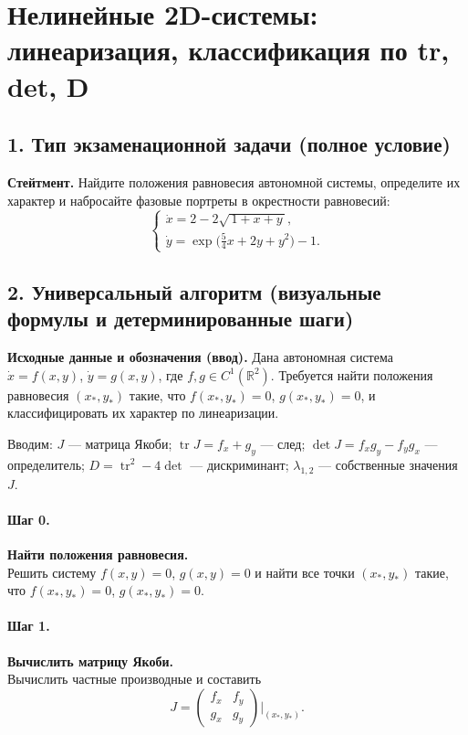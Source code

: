 \section{Нелинейные 2D-системы: линеаризация, классификация по tr, det, D}

\subsection*{1. Тип экзаменационной задачи (полное условие)}
\textbf{Стейтмент.}
Найдите положения равновесия автономной системы, определите их характер и набросайте фазовые портреты в окрестности равновесий:
\[
\begin{cases}
\dot{x}=2-2\sqrt{\,1+x+y\,},\\[4pt]
\dot{y}=\exp\!\bigl(\tfrac{5}{4}x+2y+y^{2}\bigr)-1.
\end{cases}
\]

\subsection*{2. Универсальный алгоритм (визуальные формулы и детерминированные шаги)}

\textbf{Исходные данные и обозначения (ввод).} Дана автономная система \(\dot{x}=f(x,y)\), \(\dot{y}=g(x,y)\), где \(f,g\in C^1(\mathbb{R}^2)\). Требуется найти положения равновесия \((x_*,y_*)\) такие, что \(f(x_*,y_*)=0\), \(g(x_*,y_*)=0\), и классифицировать их характер по линеаризации.

Вводим: \(J\) — матрица Якоби; \(\operatorname{tr}J=f_x+g_y\) — след; \(\det J=f_x g_y-f_y g_x\) — определитель; \(D=\operatorname{tr}^2-4\det\) — дискриминант; \(\lambda_{1,2}\) — собственные значения \(J\).

\paragraph{Шаг 0.} \textbf{Найти положения равновесия.}\\
Решить систему \(f(x,y)=0\), \(g(x,y)=0\) и найти все точки \((x_*,y_*)\) такие, что \(f(x_*,y_*)=0\), \(g(x_*,y_*)=0\).

\paragraph{Шаг 1.} \textbf{Вычислить матрицу Якоби.}\\
Вычислить частные производные и составить
\[
J=\begin{pmatrix}
f_x & f_y\\[2pt]
g_x & g_y
\end{pmatrix}\Big|_{(x_*,y_*)}.
\]

